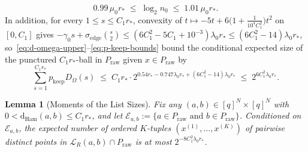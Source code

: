 \documentclass[11pt]{article}
\newtheorem{lemma}[theorem]{Lemma}
\theoremstyle{definition}
\theoremstyle{remark}
\newcommand{\Ham}{\mathrm{Ham}}
\newcommand{\dHam}{\mathrm{d}_{\Ham}}
\begin{document}
\begin{equation}
\label{eq:n0-window}
0.99\,\mu_0 r_* \;\le\; \log_2 n_0 \;\le\; 1.01\,\mu_0 r_*.
\end{equation}
In addition, for every $1 \le s \le C_1 r_*$, convexity of $t \mapsto -5 t + 6\bigl(1 + \frac{1}{10^4 C_1^2}\bigr) t^2$ on $[0, C_1]$ gives $-\gamma_0 s + \sigma_{\mathrm{edge}}\binom{s}{2} \le (6 C_1^2 - 5 C_1 + 10^{-3})\lambda_0 r_* \le (6 C_1^2 - 14)\lambda_0 r_*$, so~\eqref{eq:d-omega-upper}--\eqref{eq:p-keep-bounds} bound the conditional expected size of the punctured $C_1 r_*$-ball in $P_{\mathrm{raw}}$ given $x \in P_{\mathrm{raw}}$ by
\begin{equation}
\label{eq:ball-expectation}
\sum_{s=1}^{C_1 r_*} p_{\mathrm{keep}} D_\Omega(s) \;\le\; C_1 r_* \cdot 2^{0.54 r_* - 0.747 \lambda_0 r_* + (6 C_1^2 - 14)\lambda_0 r_*} \;\le\; 2^{6 C_1^2 \lambda_0 r_*}.
\end{equation}

\begin{lemma}[Moments of the List Sizes]
\label{lem:list-moment}
Fix any $(a, b) \in [q]^N \times [q]^N$ with $0 < \dHam(a, b) \le C_1 r_*$, and let $\mathcal{E}_{a, b} := \{a \in P_{\mathrm{raw}} \text{ and } b \in P_{\mathrm{raw}}\}$. Conditioned on $\mathcal{E}_{a, b}$, the expected number of ordered $K$-tuples $(x^{(1)}, \dots, x^{(K)})$ of pairwise distinct points in $\mathcal{L}_R(a, b) \cap P_{\mathrm{raw}}$ is at most $2^{-8 C_1^2 \lambda_0 r_*}$.
\end{lemma}
\end{document}

